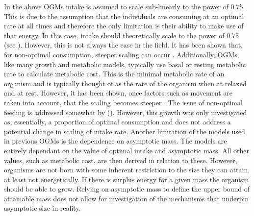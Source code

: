 \documentclass[a4paper, 11pt, hidelinks]{article} %
\begin{document}

	In the above OGMs intake is assumed to scale sub-linearly to the power of 0.75.  This is due to the assumption that the individuals are consuming at an optimal rate at all times and therefore the only limitation is their ability to make use of that energy.  In this case, intake should theoretically scale to the power of 0.75 (see \cite{West1997}).  However, this is not always the case in the field.  It has been shown that, for non-optimal consumption, steeper scaling can occur \parencite{Pawar2012, Peters1983}. Additionally, OGMs, like many growth and metabolic models, typically use basal or resting metabolic rate to calculate metabolic cost.  This is the minimal metabolic rate of an organism and is typically thought of as the rate of the organism when at relaxed and at rest.  However, it has been shown, once factors such as movement are taken into account, that the scaling becomes steeper \parencite{Weibel2004}.
	The issue of non-optimal feeding is addressed somewhat by \citeauthor{Hou2011} (\citeyear{Hou2011}).  However, this growth was only investigated as, essentially, a proportion of optimal consumption and does not address a potential change in scaling of intake rate.
	Another limitation of the models used in previous OGMs is the dependence on asymptotic mass.  The models are entirely dependant on the value of optimal intake and asymptotic mass.  All other values, such as metabolic cost, are then derived in relation to these.  However, organisms are not born with some inherent restriction to the size they can attain, at least not energetically.  If there is surplus energy for a given mass the organism should be able to grow.  Relying on asymptotic mass to define the upper bound of attainable mass does not allow for investigation of the mechanisms that underpin asymptotic size in reality. 
	
	
\end{document}
